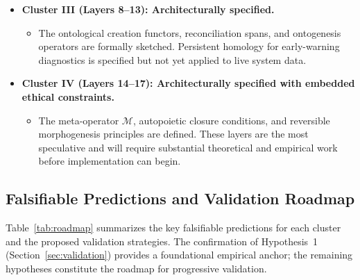 \begin{itemize}
\begin{itemize}
    \end{itemize}
    \item \textbf{Cluster III (Layers 8--13): Architecturally specified.} 
    \begin{itemize}
        \item The ontological creation functors, reconciliation spans, and ontogenesis operators are formally sketched. Persistent homology for early-warning diagnostics is specified but not yet applied to live system data.
    \end{itemize}
    \item \textbf{Cluster IV (Layers 14--17): Architecturally specified with embedded ethical constraints.}
    \begin{itemize}
        \item The meta-operator $\mathcal{M}$, autopoietic closure conditions, and reversible morphogenesis principles are defined. These layers are the most speculative and will require substantial theoretical and empirical work before implementation can begin.
    \end{itemize}
\end{itemize}

\subsection{Falsifiable Predictions and Validation Roadmap}

Table~\ref{tab:roadmap} summarizes the key falsifiable predictions for each cluster and the proposed validation strategies. The confirmation of Hypothesis~1 (Section~\ref{sec:validation}) provides a foundational empirical anchor; the remaining hypotheses constitute the roadmap for progressive validation.

